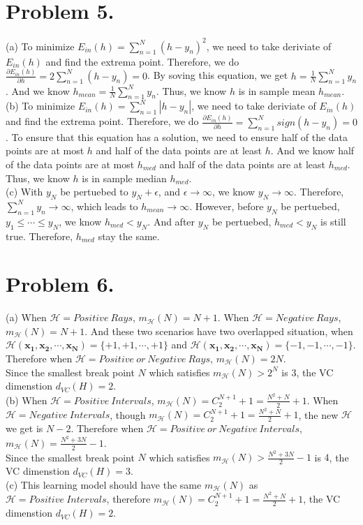 \documentclass{article}
\begin{document}
    \section*{Problem 5.}
    (a) To minimize $E_{in}(h) = \sum_{n=1}^{N}(h - y_n)^2$, we need to take deriviate of $E_{in}(h)$ and find the 
    extrema point. Therefore, we do $\frac{\partial E_{in}(h)}{\partial h} = 2\sum_{n=1}^{N}(h - y_n) = 0$. By soving 
    this equation, we get $h = \frac{1}{N}\sum_{n=1}^{N}y_n$. And we know $h_{mean} = \frac{1}{N}\sum_{n=1}^{N}y_n$. 
    Thus, we know $h$ is in sample mean $h_{mean}$.\\
    (b) To minimize $E_{in}(h) = \sum_{n=1}^{N}|h - y_n|$, we need to take deriviate of $E_{in}(h)$ and find the 
    extrema point. Therefore, we do $\frac{\partial E_{in}(h)}{\partial h} = \sum_{n=1}^{N}sign(h - y_n) = 0$. To 
    ensure that this equation has a solution, we need to ensure half of the data points are at most $h$ and half of 
    the data points are at least $h$. And we know half of the data points are at most $h_{med}$ and half of the data 
    points are at least $h_{med}$. Thus, we know $h$ is in sample median $h_{med}$.\\
    (c) With $y_N$ be pertuebed to $y_N + \epsilon$, and $\epsilon \to \infty$, we know $y_N \to \infty$. Therefore, 
    $\sum_{n=1}^{N}y_n \to \infty$, which leads to $h_{mean} \to \infty$. However, before $y_N$ be pertuebed, 
    $y_1 \leq \cdots \leq y_N$, we know $h_{med} < y_N$. And after $y_N$ be pertuebed, $h_{med} < y_N$ is still true.
    Therefore, $h_{med}$ stay the same.

    \section*{Problem 6.}
    (a) When $\mathcal{H} = Positive\:Rays$, $m_{\mathcal{H}}(N) = N + 1$. When $\mathcal{H} = Negative\:Rays$, 
    $m_{\mathcal{H}}(N) = N + 1$. And these two scenarios have two overlapped situation, when 
    $\mathcal{H}(\mathbf{x_1}, \mathbf{x_2}, \cdots, \mathbf{x_N}) = \{+1, +1, \cdots, +1\}$ and 
    $\mathcal{H}(\mathbf{x_1}, \mathbf{x_2}, \cdots, \mathbf{x_N}) = \{-1, -1, \cdots, -1\}$. Therefore when 
    $\mathcal{H} = Positive\:or\:Negative\:Rays$, $m_{\mathcal{H}}(N) = 2N$.\\
    Since the smallest break point $N$ which satisfies $m_{\mathcal{H}}(N) > 2^N$ is $3$, the VC dimenstion 
    $d_{VC}(H) = 2$.\\
    (b) When $\mathcal{H} = Positive\:Intervals$, $m_{\mathcal{H}}(N) = C_2^{N+1} + 1 = \frac{N^2 + N}{2} + 1$. 
    When $\mathcal{H} = Negative\:Intervals$, though $m_{\mathcal{H}}(N) = C_2^{N+1} + 1 = \frac{N^2 + N}{2} + 1$,
    the new $\mathcal{H}$ we get is $N - 2$. Therefore when $\mathcal{H} = Positive\:or\:Negative\:Intervals$,
    $m_{\mathcal{H}}(N) = \frac{N^2 + 3N}{2} - 1$.\\ 
    Since the smallest break point $N$ which satisfies $m_{\mathcal{H}}(N) > \frac{N^2 + 3N}{2} - 1$ is $4$, the VC 
    dimenstion $d_{VC}(H) = 3$.\\
    (c) This learning model should have the same $m_{\mathcal{H}}(N)$ as $\mathcal{H} = Positive\:Intervals$,
    therefore $m_{\mathcal{H}}(N) = C_2^{N+1} + 1 = \frac{N^2 + N}{2} + 1$, the VC dimenstion $d_{VC}(H) = 2$.
\end{document}
